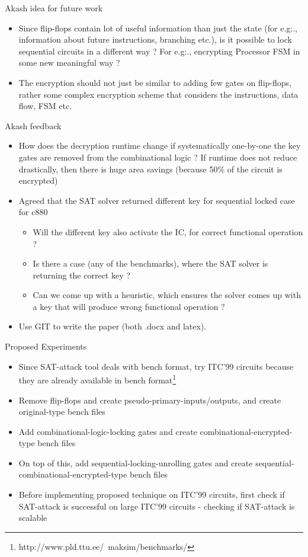 \begin{frame}{Akash idea for future work}
	\begin{itemize}
		\item Since flip-flops contain lot of useful information than just the state (for e.g:., information about future instructions, branching etc.), is it possible to lock sequential circuits in a different way ? For e.g:., encrypting Processor FSM in some new meaningful way ?
		\item The encryption should not just be similar to adding few gates on flip-flops, rather some complex encryption scheme that considers the instructions, data flow, FSM etc. 
	\end{itemize}
\end{frame}

\begin{frame}{Akash feedback}
\begin{itemize}
\item How does the decryption runtime change if systematically one-by-one the key gates are removed from the combinational logic ? If runtime does not reduce drastically, then there is huge area savings (because 50\% of the circuit is encrypted) 
\item Agreed that the SAT solver returned different key for sequential locked case for c880
	\begin{itemize}
	\item Will the different key also activate the IC, for correct functional operation ?
	\item Is there a case (any of the benchmarks), where the SAT solver is returning the correct key ?
	\item Can we come up with a heuristic, which ensures the solver comes up with a key that will produce wrong functional operation ?
	\end{itemize}
\item Use GIT to write the paper (both .docx and latex).
\end{itemize}
\end{frame}

\begin{frame}{Proposed Experiments}
	\begin{itemize}
		\item Since SAT-attack tool deals with bench format, try ITC'99 circuits because they are already available in bench format\footnote{http://www.pld.ttu.ee/~maksim/benchmarks/}
		\item Remove flip-flops and create pseudo-primary-inputs/outputs, and create original-type bench files
		\item Add combinational-logic-locking gates and create combinational-encrypted-type bench files
		\item On top of this, add sequential-locking-unrolling gates and create sequential-combinational-encrypted-type bench files
		\item Before implementing proposed technique on ITC'99 circuits, first check if SAT-attack is successful on large ITC'99 circuits - \alert{checking if SAT-attack is scalable}
	\end{itemize}
\end{frame}

